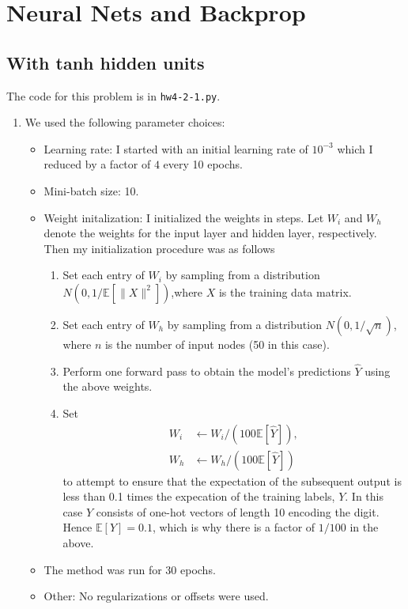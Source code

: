\documentclass{article}
\begin{document}
\section{Neural Nets and Backprop}
\subsection{With tanh hidden units}
The code for this problem is in \texttt{hw4-2-1.py}.
\begin{enumerate}
    \item We used the following parameter choices:
    \begin{itemize}
        \item Learning rate: I started with an initial learning rate of $10^{-3}$ which I reduced by a factor of $4$ every 10 epochs.
        \item Mini-batch size: 10.
        \item Weight initalization: I initialized the weights in steps. Let $W_i$ and $W_h$ denote the weights for the input layer and hidden layer, respectively. Then my initialization procedure was as follows
        \begin{enumerate}
            \item Set each entry of $W_i$ by sampling from a distribution $N(0,1/\mathbb{E}[\|X\|^2])$,where $X$ is the training data matrix.
            \item Set each entry of $W_h$ by sampling from a distribution $N(0,1/\sqrt{n})$, where $n$ is the number of input nodes (50 in this case).
            \item Perform one forward pass to obtain the model's predictions $\hat Y$ using the above weights.
            \item Set 
            \begin{align*}
            W_i &\leftarrow W_i / (100 \mathbb{E}[\hat Y]),\\
            W_h &\leftarrow W_h / (100 \mathbb{E}[\hat Y])
            \end{align*}
            to attempt to ensure that the expectation of the subsequent output is less than 0.1 times the expecation of the training labels, $Y$. In this case $Y$ consists of one-hot vectors of length 10 encoding the digit. Hence $\mathbb{E}[Y]=0.1$, which is why there is a factor of $1/100$ in the above.
        \end{enumerate}
        \item The method was run for 30 epochs.
        \item Other: No regularizations or offsets were used.
        

\end{itemize}
\end{enumerate}
\end{document}
